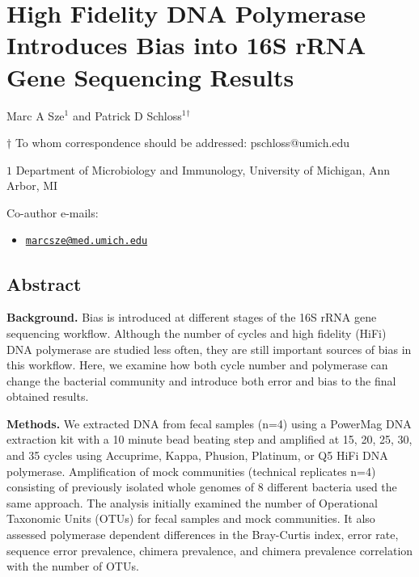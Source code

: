 \documentclass[12pt,]{article}
\title{}
\author{}
\date{}
\providecommand{\tightlist}{%
  \setlength{\itemsep}{0pt}\setlength{\parskip}{0pt}}
\begin{document}
\section{High Fidelity DNA Polymerase Introduces Bias into 16S rRNA Gene
Sequencing
Results}\label{high-fidelity-dna-polymerase-introduces-bias-into-16s-rrna-gene-sequencing-results}

\begin{center}
\vspace{25mm}

Marc A Sze${^1}$ and Patrick D Schloss${^1}$${^\dagger}$

\vspace{20mm}

$\dagger$ To whom correspondence should be addressed: pschloss@umich.edu

$1$ Department of Microbiology and Immunology, University of Michigan, Ann Arbor, MI




\end{center}

Co-author e-mails:

\begin{itemize}
\tightlist
\item
  \href{mailto:marcsze@med.umich.edu}{\nolinkurl{marcsze@med.umich.edu}}
\end{itemize}

\newpage

\linenumbers

\subsection{Abstract}\label{abstract}

\textbf{Background.} Bias is introduced at different stages of the 16S
rRNA gene sequencing workflow. Although the number of cycles and high
fidelity (HiFi) DNA polymerase are studied less often, they are still
important sources of bias in this workflow. Here, we examine how both
cycle number and polymerase can change the bacterial community and
introduce both error and bias to the final obtained results.

\textbf{Methods.} We extracted DNA from fecal samples (n=4) using a
PowerMag DNA extraction kit with a 10 minute bead beating step and
amplified at 15, 20, 25, 30, and 35 cycles using Accuprime, Kappa,
Phusion, Platinum, or Q5 HiFi DNA polymerase. Amplification of mock
communities (technical replicates n=4) consisting of previously isolated
whole genomes of 8 different bacteria used the same approach. The
analysis initially examined the number of Operational Taxonomic Units
(OTUs) for fecal samples and mock communities. It also assessed
polymerase dependent differences in the Bray-Curtis index, error rate,
sequence error prevalence, chimera prevalence, and chimera prevalence
correlation with the number of OTUs.
\end{document}
